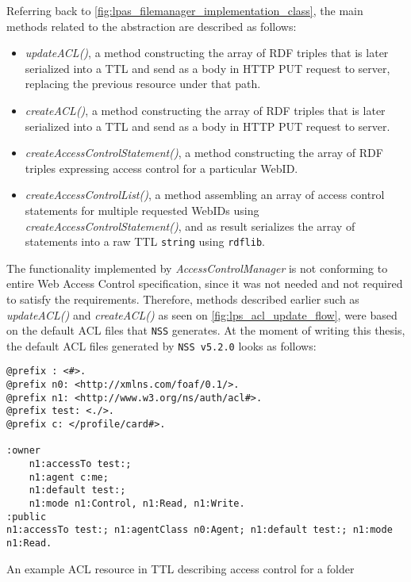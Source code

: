 Referring back to \autoref{fig:lpas_filemanager_implementation_class}, the main methods related to the abstraction are described as follows:
\begin{itemize}
    \item \textit{updateACL()}, a method constructing the array of RDF triples that is later serialized into a TTL and send as a body in HTTP PUT request to \solid{} server, replacing the previous resource under that path.
    \item \textit{createACL()}, a method constructing the array of RDF triples that is later serialized into a TTL and send as a body in HTTP PUT request to \solid{} server.
    \item \textit{createAccessControlStatement()}, a method constructing the array of RDF triples expressing access control for a particular WebID. 
    \item \textit{createAccessControlList()}, a method assembling an array of access control statements for multiple requested WebIDs using \textit{createAccessControlStatement()}, and as result serializes the array of statements into a raw TTL \texttt{string} using \texttt{rdflib}.
\end{itemize}

The functionality implemented by \textit{AccessControlManager} is not conforming to entire Web Access Control specification, since it was not needed and not required to satisfy the \lpa{} requirements. Therefore, methods described earlier such as \textit{updateACL()} and \textit{createACL()} as seen on \autoref{fig:lps_acl_update_flow}, were based on the default ACL files that \texttt{NSS} generates. At the moment of writing this thesis, the default ACL files generated by \texttt{NSS v5.2.0} looks as follows:

\begin{listing}[H]    
\begin{verbatim}
@prefix : <#>.
@prefix n0: <http://xmlns.com/foaf/0.1/>.
@prefix n1: <http://www.w3.org/ns/auth/acl#>.
@prefix test: <./>.
@prefix c: </profile/card#>.
 
:owner
    n1:accessTo test:;
    n1:agent c:me;
    n1:default test:;
    n1:mode n1:Control, n1:Read, n1:Write.
:public
n1:accessTo test:; n1:agentClass n0:Agent; n1:default test:; n1:mode n1:Read.
\end{verbatim}
\caption{An example ACL resource in TTL describing access control for a folder} 
\label{lst:acl_file_example}
\end{listing}

